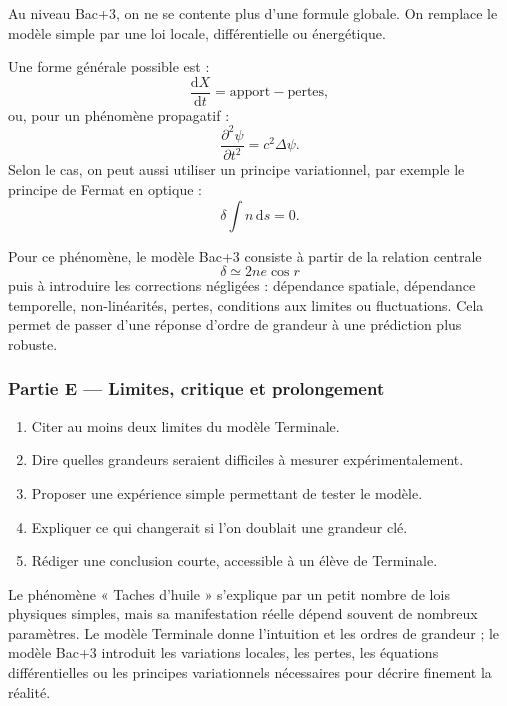 \documentclass[11pt,a4paper]{article}
\begin{document}
\begin{approfondissementbox}
Au niveau Bac+3, on ne se contente plus d'une formule globale. On remplace le modèle simple par une loi locale, différentielle ou énergétique.

Une forme générale possible est :
\[
\frac{\mathrm d X}{\mathrm dt}=\text{apport}-\text{pertes},
\]
ou, pour un phénomène propagatif :
\[
\frac{\partial^2 \psi}{\partial t^2}=c^2\Delta\psi.
\]
Selon le cas, on peut aussi utiliser un principe variationnel, par exemple le principe de Fermat en optique :
\[
\delta \int n\,\mathrm ds=0.
\]

Pour ce phénomène, le modèle Bac+3 consiste à partir de la relation centrale
\[
\delta\simeq2ne\cos r
\]
puis à introduire les corrections négligées : dépendance spatiale, dépendance temporelle, non-linéarités, pertes, conditions aux limites ou fluctuations. Cela permet de passer d'une réponse d'ordre de grandeur à une prédiction plus robuste.
\end{approfondissementbox}

\subsubsection*{Partie E — Limites, critique et prolongement}

\begin{enumerate}
  \item Citer au moins deux limites du modèle Terminale.
  \item Dire quelles grandeurs seraient difficiles à mesurer expérimentalement.
  \item Proposer une expérience simple permettant de tester le modèle.
  \item Expliquer ce qui changerait si l'on doublait une grandeur clé.
  \item Rédiger une conclusion courte, accessible à un élève de Terminale.
\end{enumerate}

\begin{corrigebox}
Le phénomène « Taches d'huile » s'explique par un petit nombre de lois physiques simples, mais sa manifestation réelle dépend souvent de nombreux paramètres. Le modèle Terminale donne l'intuition et les ordres de grandeur ; le modèle Bac+3 introduit les variations locales, les pertes, les équations différentielles ou les principes variationnels nécessaires pour décrire finement la réalité.
\end{corrigebox}
\end{document}
